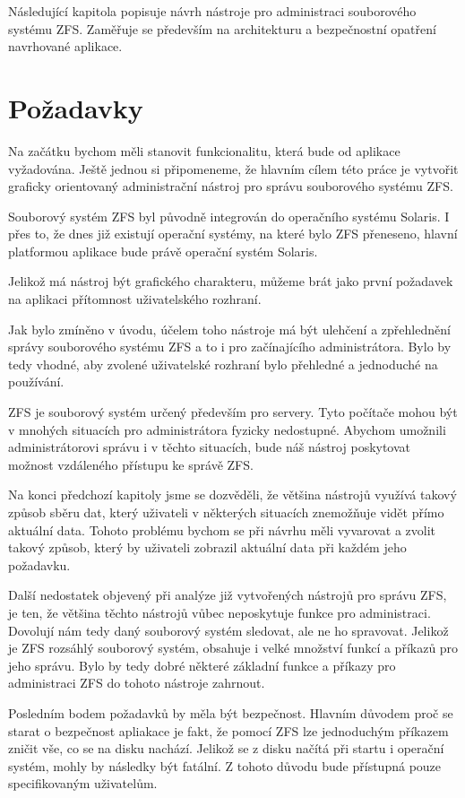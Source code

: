 Následující kapitola popisuje návrh nástroje pro administraci souborového systému ZFS. Zaměřuje se především na architekturu a bezpečnostní opatření navrhované aplikace.
\section{Požadavky}
Na začátku bychom měli stanovit funkcionalitu, která bude od aplikace vyžadována. Ještě jednou si připomeneme, že hlavním cílem této práce je vytvořit graficky orientovaný administrační nástroj pro správu souborového systému ZFS.

Souborový systém ZFS byl původně integrován do operačního systému Solaris. I přes to, že dnes již existují operační systémy, na které bylo ZFS přeneseno, hlavní platformou aplikace bude právě operační systém Solaris.

Jelikož má nástroj být grafického charakteru, můžeme brát jako první požadavek na aplikaci přítomnost uživatelského rozhraní.

Jak bylo zmíněno v úvodu, účelem toho nástroje má být ulehčení a zpřehlednění správy souborového systému ZFS a to i pro začínajícího administrátora. Bylo by tedy vhodné, aby zvolené uživatelské rozhraní bylo přehledné a jednoduché na používání.

ZFS je souborový systém určený především pro servery. Tyto počítače mohou být v mnohých situacích pro administrátora fyzicky nedostupné. Abychom umožnili administrátorovi správu i v těchto situacích, bude náš nástroj poskytovat možnost vzdáleného přístupu ke správě ZFS.

Na konci předchozí kapitoly jsme se dozvěděli, že většina nástrojů využívá takový způsob sběru dat, který uživateli v některých situacích znemožňuje vidět přímo aktuální data. Tohoto problému bychom se při návrhu měli vyvarovat a zvolit takový způsob, který by uživateli zobrazil aktuální data při každém jeho požadavku.

Další nedostatek objevený při analýze již vytvořených nástrojů pro správu ZFS, je ten, že většina těchto nástrojů vůbec neposkytuje funkce pro administraci. Dovolují nám tedy daný souborový systém sledovat, ale ne ho spravovat. Jelikož je ZFS rozsáhlý souborový systém, obsahuje i velké množství funkcí a příkazů pro jeho správu. Bylo by tedy dobré některé základní funkce a příkazy pro administraci ZFS do tohoto nástroje zahrnout.

Posledním bodem požadavků by měla být bezpečnost. Hlavním důvodem proč se starat o bezpečnost apliakace je fakt, že pomocí ZFS lze jednoduchým příkazem zničit vše, co se na disku nachází. Jelikož se z disku načítá při startu i operační systém, mohly by následky být fatální. Z tohoto důvodu bude přístupná pouze specifikovaným uživatelům.

